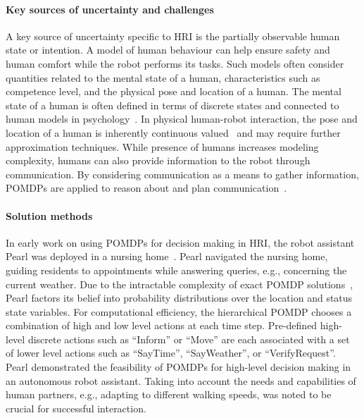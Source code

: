\documentclass[journal]{IEEEtran}
\begin{document}
\paragraph{Key sources of uncertainty and challenges}
A key source of uncertainty specific to HRI is the partially
observable human state or intention.
{A model of human behaviour can help} ensure safety and human comfort while {the robot performs its} tasks. Such models often consider quantities related to the mental state
of a human, characteristics such as competence level, and the physical
pose and location of a human. The mental state of a human is often
defined in terms of discrete states and connected to human models in
psychology~\cite{hoey2010automated,taha2011pomdp,chen2018planning}. In
physical human-robot interaction, the pose and location of a human is
inherently continuous valued~\cite{wang2017anticipatory} and may
require further approximation techniques. While presence of humans
increases modeling complexity, humans can also provide information to
the robot through communication. By considering communication as a
means to gather information, POMDPs are applied to reason about
and plan
communication~\cite{armstrong2007oracular,atrash2009bayesian,atrash2010bayesian,hoelscher2018utilizing,unhelkar2020decision}.


\paragraph{Solution methods}
%
In early work on using POMDPs for decision making in HRI, {the robot assistant Pearl was deployed in a nursing home~\cite{pineau2003towards}.
Pearl navigated the nursing home, guiding residents to appointments while answering queries, e.g., concerning the current weather.
}
Due to the intractable
complexity of exact POMDP solutions~\cite{cassandra1997incremental},
Pearl {factors its belief into probability distributions over the}
location and status state variables. For computational efficiency,
the hierarchical POMDP chooses a combination of high and low level actions
at each time step.
Pre-defined high-level discrete actions such as ``Inform'' or ``Move'' are each associated with a set of lower level actions such
as ``SayTime'', ``SayWeather'', or ``VerifyRequest''.
{Pearl demonstrated the feasibility of POMDPs for high-level decision making in an autonomous robot assistant. Taking into account the needs and capabilities of human partners, e.g., adapting to different walking speeds, was noted to be crucial for successful interaction.}
\end{document}

